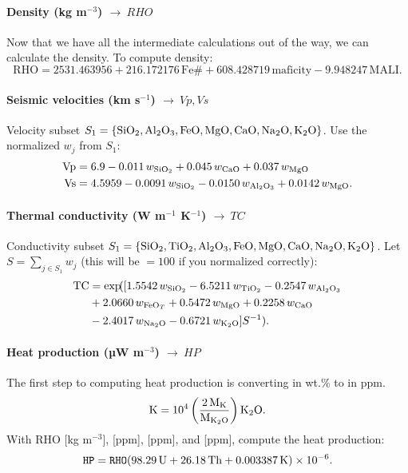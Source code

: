 \documentclass[11pt,a4paper]{article}
\begin{document}
\paragraph{Density (kg m$^{-3}$) \(\to\ RHO\)}

Now that we have all the intermediate calculations out of the way, we can calculate the density.  To compute density:
\[
  \mathrm{RHO} = 2531.463956 + 216.172176\,\mathrm{Fe\#}
  + 608.428719\,\mathrm{maficity} - 9.948247\,\mathrm{MALI}.
\]

\paragraph{Seismic velocities (km s$^{-1}$) \(\to\ Vp, Vs\)}

Velocity subset \(S_1 = \{\ce{SiO2},\ce{Al2O3},\ce{FeO},\ce{MgO},\ce{CaO},\ce{Na2O},\ce{K2O}\}\).
Use the normalized \(w_j\) from \(S_1\):
\begin{align*}
  \mathrm{Vp} &= 6.9 - 0.011\,w_{\ce{SiO2}}
  + 0.045\,w_{\ce{CaO}} + 0.037\,w_{\ce{MgO}}\\
  \mathrm{Vs} &= 4.5959 - 0.0091\,w_{\ce{SiO2}}
  - 0.0150\,w_{\ce{Al2O3}} + 0.0142\,w_{\ce{MgO}}.
\end{align*}

\paragraph{Thermal conductivity (W m$^{-1}$ K$^{-1}$) \(\to\ TC\)}

Conductivity subset \(S_1 = \{\ce{SiO2},\ce{TiO2},\ce{Al2O3},\ce{FeO},\ce{MgO},\ce{CaO},\ce{Na2O},\ce{K2O}\}\).
Let \(S = \sum_{j \in S_1} w_j\) (this will be \(=100\) if you normalized correctly):
\begin{align*}
  \mathrm{TC} &= \exp\!(
  [ 1.5542\,w_{\ce{SiO2}}
  - 6.5211\,w_{\ce{TiO2}}
  - 0.2547\,w_{\ce{Al2O3}} \\
  &+ 2.0660\,w_{\ce{FeO}_{T}}
  + 0.5472\,w_{\ce{MgO}}
  + 0.2258\,w_{\ce{CaO}} \\
  &- 2.4017\,w_{\ce{Na2O}}
  - 0.6721\,w_{\ce{K2O}} ] S^{-1}).
\end{align*}


\paragraph{Heat production (µW m$^{-3}$) \(\to\ HP\)}

The first step to computing heat production is converting  in wt.\% to  in ppm.
\[
  \ce{K} = 10^{4} \left( \frac{2\,\mathrm{M}_{\ce{K}}}{\mathrm{M}_{\ce{K2O}}} \right) \ce{K2O}.
\]
With RHO [kg m$^{-3}$],  [ppm],  [ppm], and  [ppm], compute the heat production:
\[
  \texttt{HP} = \texttt{RHO} ( 98.29\,\ce{U}
  + 26.18\,\ce{Th} + 0.003387\,\ce{K} )\times 10^{-6}.
\]
\end{document}
